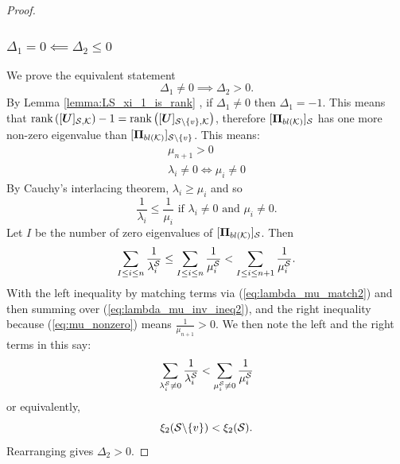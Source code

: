 \begin{proof}
\subsubsection{\texorpdfstring{$\Delta_{1} = 0 \impliedby \Delta_{2} \leq 0$}{\textDelta\textoneinferior = 0 <== \textDelta\texttwoinferior =< 0}} We prove the equivalent statement
\begin{equation}
    \Delta_{1} \neq 0 \implies \Delta_{2} > 0 .
\end{equation}
By Lemma \ref{lemma:LS_xi_1_is_rank} , if $\Delta_{1} \neq 0$ then $ \Delta_{1} = -1$. This means that  $\rank{\matrsubU{S}} -1 = \rank{\matrsubUGen{\set{S} \backslash \{v\}}}$, therefore $\projbl[S]$ has one more non-zero eigenvalue than $[\bm{\Pi}_{bl(\mathcal{K})}]_{\mathcal{S} \backslash \{v\}}$. This means:
\begin{align}
    \mu_{n+1} > 0 \label{eq:mu_nonzero} \\
    \lambda_{i} \neq 0 \iff \mu_{i} \neq 0 \label{eq:lambda_mu_match2}
\end{align}
By Cauchy's interlacing theorem, $\lambda_i \geq \mu_i$ and so
\begin{equation}
        \frac{1}{\lambda_{i}} \leq \frac{1}{\mu_{i}} \text{ if } \lambda_{i} \neq 0 \text{ and } \mu_{i} \neq 0.  \label{eq:lambda_mu_inv_ineq2}
    \end{equation}
    Let $I$ be the number of zero eigenvalues of $\projbl[S]$. Then 
\begin{equation}
    \sum_{I\leq i \leq n} { \frac{1}{\lambda_{i}^{\mathcal{S}}}} \leq \sum_{I\leq i \leq n} { \frac{1}{\mu_{i}^{\mathcal{S}}}} <  \sum_{I \leq i \leq n+1} { \frac{1}{\mu_{i}^{\mathcal{S}}}}. \label{eq:eig_sum_ineq2_intermediate}
\end{equation}
With the left inequality by matching terms via (\ref{eq:lambda_mu_match2}) and then summing over (\ref{eq:lambda_mu_inv_ineq2}), and the right inequality because (\ref{eq:mu_nonzero}) means $\frac{1}{\mu_{n+1}} > 0$. We then note the left and the right terms in this  say:
\begin{equation}
     \sum_{\lambda_{i}^{\mathcal{S}} \neq 0} { \frac{1}{\lambda_{i}^{\mathcal{S}}}} < \sum_{\mu_{i}^{\mathcal{S}} \neq 0} { \frac{1}{\mu_{i}^{\mathcal{S}}}} \label{eq:eig_sum_ineq2}
 \end{equation}
or equivalently,
\begin{equation}
 \xi_{2}(\mathcal{S} \backslash \{v\}) < \xi_{2}(\mathcal{S}).   
\end{equation}
Rearranging gives $\Delta_{2} > 0$.
\end{proof}


